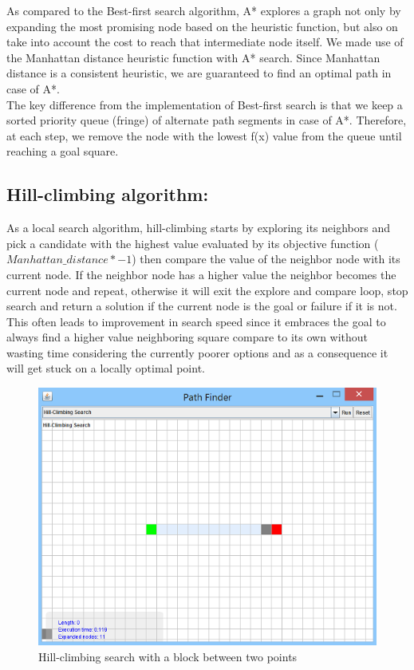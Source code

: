 \documentclass[a4paper]{article}
\begin{document}
As compared to the Best-first search algorithm, A* explores a graph not only by expanding the most promising node based on the heuristic function, but also on take into account the cost to reach that intermediate node itself. We made use of the Manhattan distance heuristic function with A* search. Since Manhattan distance is a consistent heuristic, we are guaranteed to find an optimal path in case of A*. \\

The key difference from the implementation of Best-first search is that we keep a sorted priority queue (fringe) of alternate path segments in case of A*. Therefore, at each step, we remove the node with the lowest f(x) value from the queue until reaching a goal square.


\subsection{Hill-climbing algorithm:}

As a local search algorithm, hill-climbing starts by exploring its neighbors and pick a candidate with the highest value evaluated by its objective function ($Manhattan\_distance * -1$) then compare the value of the neighbor node with its current node. If the neighbor node has a higher value the neighbor becomes the current node and repeat, otherwise it will exit the explore and compare loop, stop search and return a solution if the current node is the goal or failure if it is not. This often leads to improvement in search speed since it embraces the goal to always find a higher value neighboring square compare to its own without wasting time considering the currently poorer options and as a consequence it will get stuck on a locally optimal point. \\

\begin{figure}[h!]
  \centering
    \includegraphics[scale=.9]{images/hillclimb1.png}
  \caption{Hill-climbing search with a block between two points}
  \label{fig:hillClimbing}
\end{figure}
\end{document}
